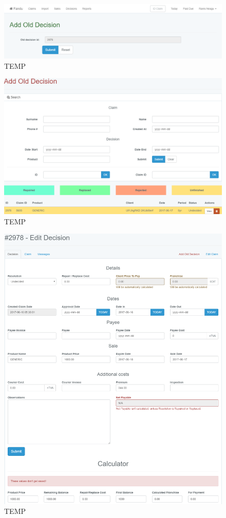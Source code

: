 	\begin{figure}
		\includegraphics[width=\linewidth]{../imagini/decisions_add_conirm.png}
		\caption{TEMP}
		\label{fig:TEMP}
	\end{figure}
	\begin{figure}
		\includegraphics[width=\linewidth]{../imagini/decisions_add_old.png}
		\caption{TEMP}
		\label{fig:TEMP}
	\end{figure}
	\begin{figure}
		\includegraphics[width=\linewidth]{../imagini/decisions_edit.png}
		\caption{TEMP}
		\label{fig:TEMP}
	\end{figure}
